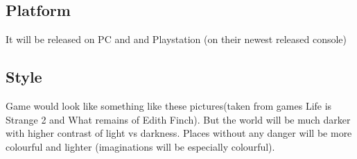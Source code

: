 \documentclass[a4paper,10pt,english]{article}
\begin{document}
\subsection*{Platform}
It will be released on PC and and Playstation (on their newest released console)

\subsection*{Style}
Game would look like something like these pictures(taken from games Life is Strange 2 and What remains of Edith Finch). But the world will be much darker with higher contrast of light vs darkness. Places without any danger will be more colourful and lighter (imaginations will be especially colourful).

\begin{figure}[h]

\centering


\end{figure}
\end{document}

